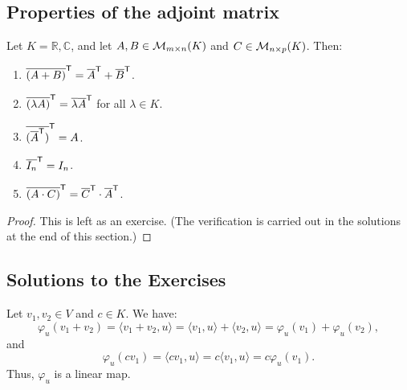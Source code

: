 \subsection*{Properties of the adjoint matrix}

\begin{proposition}
\label{prop:properties_adjoint_matrix}
Let $K = \mathbb{R}, \mathbb{C}$, and let $A, B \in \mathcal{M}_{m \times n}(K)$ and $C \in \mathcal{M}_{n \times p}(K)$. Then:
\begin{enumerate}[label=\textbf{(\alph*)}]
    \item $\overline{(A+B)}^{\mathsf{T}} = \overline{A}^{\mathsf{T}} + \overline{B}^{\mathsf{T}}$.
    \item $\overline{(\lambda A)}^{\mathsf{T}} = \overline{\lambda} \overline{A}^{\mathsf{T}}$ for all $\lambda \in K$.
    \item $\overline{(\overline{A}^{\mathsf{T}})}^{\mathsf{T}} = A$.
    \item $\overline{I_n}^{\mathsf{T}} = I_n$.
    \item $\overline{(A \cdot C)}^{\mathsf{T}} = \overline{C}^{\mathsf{T}} \cdot \overline{A}^{\mathsf{T}}$.
\end{enumerate}
\end{proposition}

\begin{proof}
This is left as an exercise. (The verification is carried out in the solutions at the end of this section.)
\end{proof}


\subsection{Solutions to the Exercises}
\label{sec:solutions_dual_spaces_inner_products}

\begin{exercisesolution}
\label{sol:linearity_phi_u}
Let $v_1, v_2 \in V$ and $c \in K$. We have:
\[
    \varphi_u(v_1 + v_2) = \langle v_1 + v_2, u \rangle = \langle v_1, u \rangle + \langle v_2, u \rangle = \varphi_u(v_1) + \varphi_u(v_2),
\]
and
\[
    \varphi_u(c v_1) = \langle c v_1, u \rangle = c \langle v_1, u \rangle = c \varphi_u(v_1).
\]
Thus, $\varphi_u$ is a linear map.
\end{exercisesolution}

